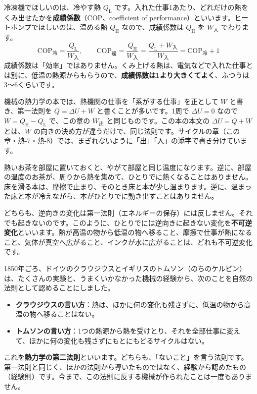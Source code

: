 冷凍機でほしいのは、冷やす熱 $Q_{\mathrm L}$ です。入れた仕事1あたり、どれだけの熱をくみ出せたかを\textbf{成績係数}（COP、coefficient of performance）といいます。ヒートポンプでほしいのは、温める熱 $Q_{\mathrm H}$ なので、成績係数は $Q_{\mathrm H}$ を $W_{\text{入}}$ でわります。
\[\mathrm{COP}_{\text{冷}}=\frac{Q_{\mathrm L}}{W_{\text{入}}},\qquad\mathrm{COP}_{\text{暖}}=\frac{Q_{\mathrm H}}{W_{\text{入}}}=\frac{Q_{\mathrm L}+W_{\text{入}}}{W_{\text{入}}}=\mathrm{COP}_{\text{冷}}+1\]
\label{ph:熱-5:cop}成績係数は「効率」ではありません。くみ上げる熱は、電気などで入れた仕事とは別に、低温の熱源からもらうので、\textbf{成績係数は1より大きくてよく}、ふつうは3〜6くらいです。

\begin{seikaku}
機械の熱力学の本では、熱機関の仕事を「系がする仕事」を正として $W$ と書き、第一法則を $Q=\Delta U+W$ と書くことが多いです。1周で $\Delta U=0$ なので $W=Q_{\mathrm H}-Q_{\mathrm L}$ で、この章の $W_{\text{出}}$ と同じものです。この本の本文の $\Delta U=Q+W$ とは、$W$ の向きの決め方が違うだけで、同じ法則です。サイクルの章（この章・熱-7・熱-8）では、まぎれないように「出」「入」の添字で書き分けています。
\end{seikaku}

\label{ph:熱-5:sec3}
熱いお茶を部屋に置いておくと、やがて部屋と同じ温度になります。逆に、部屋の温度のお茶が、周りから熱を集めて、ひとりでに熱くなることはありません。床を滑る本は、摩擦で止まり、そのとき床と本が少し温まります。逆に、温まった床と本が冷えながら、本がひとりでに動き出すことはありません。

どちらも、逆向きの変化は第一法則（エネルギーの保存）には反しません。それでも起きないのです。このように、ひとりでには逆向きに起きない変化を\textbf{不可逆変化}といいます。\label{ph:熱-5:fukagyaku}熱が高温の物から低温の物へ移ること、摩擦で仕事が熱になること、気体が真空へ広がること、インクが水に広がることは、どれも不可逆変化です。

1850年ごろ、ドイツのクラウジウスとイギリスのトムソン（のちのケルビン）は、たくさんの実験と、うまくいかなかった機械の経験から、次のことを自然の法則として認めることにしました。\label{ph:熱-5:dai2}
\begin{itemize}[leftmargin=2\zw, itemsep=2pt, topsep=2pt]
\item \textbf{クラウジウスの言い方}：熱は、ほかに何の変化も残さずに、低温の物から高温の物へ移ることはない。
\item \textbf{トムソンの言い方}：1つの熱源から熱を受けとり、それを全部仕事に変えて、ほかに何の変化も残さずにもとにもどるサイクルはない。
\end{itemize}
これを\textbf{熱力学の第二法則}といいます。どちらも、「ないこと」を言う法則です。第一法則と同じく、ほかの法則から導いたものではなく、経験から認めたもの（経験則）です。今まで、この法則に反する機械が作られたことは一度もありません。

